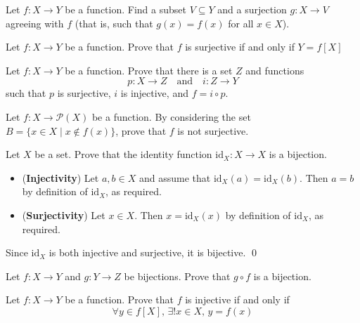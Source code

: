 \begin{exercise}
Let $f : X \to Y$ be a function. Find a subset $V \subseteq Y$ and a surjection $g : X \to V$ agreeing with $f$ (that is, such that $g(x)=f(x)$ for all $x \in X$).
\end{exercise}

\begin{exercise}
Let $f : X \to Y$ be a function. Prove that $f$ is surjective if and only if $Y=f[X]$
\end{exercise}

\begin{exercise}
\label{exEpiMonoFactorisation}
Let $f : X \to Y$ be a function. Prove that there is a set $Z$ and functions
\[ p : X \to Z \quad \text{and} \quad i : Z \to Y \]
such that $p$ is surjective, $i$ is injective, and $f = i \circ p$.
\end{exercise}

\begin{exercise}
Let $f : X \to \mathcal{P}(X)$ be a function. By considering the set $B = \{ x \in X \mid x \not\in f(x) \}$, prove that $f$ is not surjective.
\end{exercise}


\begin{exercise}
Let $X$ be a set. Prove that the identity function $\mathrm{id}_X : X \to X$ is a bijection.
\end{exercise}

\begin{solutions*}
\fixlistskip%
\begin{itemize}
\item (\textbf{Injectivity}) Let $a,b \in X$ and assume that $\mathrm{id}_X(a) = \mathrm{id}_X(b)$. Then $a=b$ by definition of $\mathrm{id}_X$, as required.
\item (\textbf{Surjectivity}) Let $x \in X$. Then $x=\mathrm{id}_X(x)$ by definition of $\mathrm{id}_X$, as required.
\end{itemize}
Since $\mathrm{id}_X$ is both injective and surjective, it is bijective. \qed
\end{solutions*}

\begin{exercise}
\label{exCompositeOfBijectionsIsBijection}
Let $f : X \to Y$ and $g : Y \to Z$ be bijections. Prove that $g \circ f$ is a bijection.
\end{exercise}

\begin{exercise}
Let $f : X \to Y$ be a function. Prove that $f$ is injective if and only if
\[ \forall y \in f[X],\, \exists ! x \in X,\, y=f(x) \]
\end{exercise}

